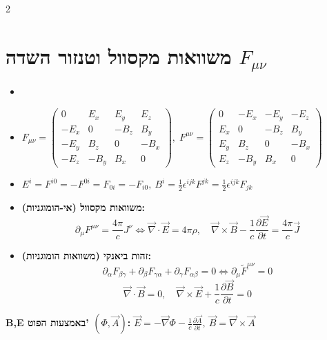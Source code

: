 \documentclass[10pt,a4paper]{article}
\begin{document}
\begin{multicols*}{2}
\section{משוואות מקסוול וטנזור השדה $F_{\mu\nu}$}
\begin{itemize}
    \item 
    \item 
    {\scriptsize
    \setlength{\arraycolsep}{1.5pt}
    $
    F_{\mu\nu} = \begin{pmatrix}
    0 & E_x & E_y & E_z \\
    -E_x & 0 & -B_z & B_y \\
    -E_y & B_z & 0 & -B_x \\
    -E_z & -B_y & B_x & 0
    \end{pmatrix}, \;
    F^{\mu\nu} = \begin{pmatrix}
    0 & -E_x & -E_y & -E_z \\
    E_x & 0 & -B_z & B_y \\
    E_y & B_z & 0 & -B_x \\
    E_z & -B_y & B_x & 0
    \end{pmatrix}
    $
    }
    \item 
    $
    E^i = F^{i0} = -F^{0i} = F_{0i} = -F_{i0}, \:
    B^i = \frac{1}{2}\epsilon^{ijk} F^{jk} = \frac{1}{2}\epsilon^{ijk} F_{jk}
    $
    \item \textbf{משוואות מקסוול (אי-הומוגניות):}
    \[
    \partial_\mu F^{\mu\nu} = \frac{4\pi}{c} J^\nu \iff \vec{\nabla}\cdot\vec{E} = 4\pi\rho, \quad \vec{\nabla}\times\vec{B} - \frac{1}{c}\frac{\partial\vec{E}}{\partial t} = \frac{4\pi}{c}\vec{J}
    \]
    \item \textbf{זהות ביאנקי (משוואות הומוגניות):}
    \[
    \partial_\alpha F_{\beta\gamma} + \partial_\beta F_{\gamma\alpha} + \partial_\gamma F_{\alpha\beta} = 0 \iff \partial_\mu \tilde{F}^{\mu\nu} = 0
    \]
    \[
    \vec{\nabla}\cdot\vec{B} = 0, \quad \vec{\nabla}\times\vec{E} + \frac{1}{c}\frac{\partial\vec{B}}{\partial t} = 0
    \]
\end{itemize}

\textbf{B,E באמצעות הפוט' $(\Phi, \vec{A})$:}
$
\vec{E} = -\vec{\nabla}\Phi - \frac{1}{c}\frac{\partial \vec{A}}{\partial t}, \ \vec{B} = \vec{\nabla} \times \vec{A}
$


\end{multicols*}
\end{document}
